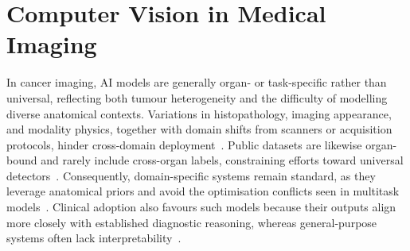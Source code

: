 \documentclass[final,british,a4paper,12pt]{phdthesis}
\begin{document}



\section{Computer Vision in Medical Imaging}
In cancer imaging, AI models are generally organ- or task-specific rather than universal, reflecting both tumour heterogeneity and the difficulty of modelling diverse anatomical contexts. Variations in histopathology, imaging appearance, and modality physics, together with domain shifts from scanners or acquisition protocols, hinder cross-domain deployment~\cite{bian2025artificial,ma2024segment,guan2021domain,koh2022artificial}. Public datasets are likewise organ-bound and rarely include cross-organ labels, constraining efforts toward universal detectors~\cite{wei2025multicenter,ali2021state}. Consequently, domain-specific systems remain standard, as they leverage anatomical priors and avoid the optimisation conflicts seen in multitask models~\cite{bian2025artificial,guan2021domain}. Clinical adoption also favours such models because their outputs align more closely with established diagnostic reasoning, whereas general-purpose systems often lack interpretability~\cite{ma2024segment,zhang2024challenges}.
\end{document}
